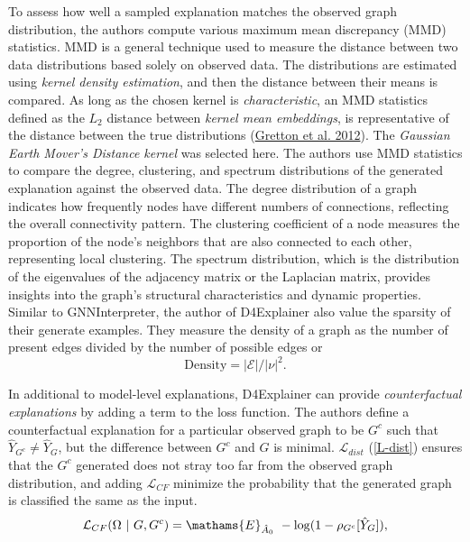 \documentclass[
  11pt,
  letterpaper,
]{article}
\begin{document}
\quad To assess how well a sampled explanation matches the observed
graph distribution, the authors compute various maximum mean discrepancy
(MMD) statistics. MMD is a general technique used to measure the
distance between two data distributions based solely on observed data.
The distributions are estimated using \emph{kernel density estimation},
and then the distance between their means is compared. As long as the
chosen kernel is \emph{characteristic}, an MMD statistics defined as the
\(L_2\) distance between \emph{kernel mean embeddings}, is
representative of the distance between the true distributions
(\protect\hyperlink{ref-Gretton_Borgwardt_Rasch_Schuxf6lkopf_Smola_2012}{Gretton
et al. 2012}). The \emph{Gaussian Earth Mover's Distance kernel} was
selected here. The authors use MMD statistics to compare the degree,
clustering, and spectrum distributions of the generated explanation
against the observed data. The degree distribution of a graph indicates
how frequently nodes have different numbers of connections, reflecting
the overall connectivity pattern. The clustering coefficient of a node
measures the proportion of the node's neighbors that are also connected
to each other, representing local clustering. The spectrum distribution,
which is the distribution of the eigenvalues of the adjacency matrix or
the Laplacian matrix, provides insights into the graph's structural
characteristics and dynamic properties. Similar to GNNInterpreter, the
author of D4Explainer also value the sparsity of their generate
examples. They measure the density of a graph as the number of present
edges divided by the number of possible edges or \begin{equation}
    \text{Density} = \mathcal{|E|} / |\nu|^2. 
\end{equation}

\quad In additional to model-level explanations, D4Explainer can provide
\emph{counterfactual explanations} by adding a term to the loss
function. The authors define a counterfactual explanation for a
particular observed graph to be \(G^c\) such that
\(\hat Y_{G^c} \neq \hat Y_G\), but the difference between \(G^c\) and
\(G\) is minimal. \(\mathcal{L}_{dist}\) (\ref{L-dist}) ensures that the
\(G^c\) generated does not stray too far from the observed graph
distribution, and adding \(\mathcal{L}_{CF}\) minimize the probability
that the generated graph is classified the same as the input.
\begin{equation}
        \mathcal{L}_{CF}(\Omega \ | \ G, G^c) = \mathams{E}_{\hat A_0} \ - \log(1 - \rho_{G^c}[\hat Y_{G}]), 
\end{equation}
\end{document}
